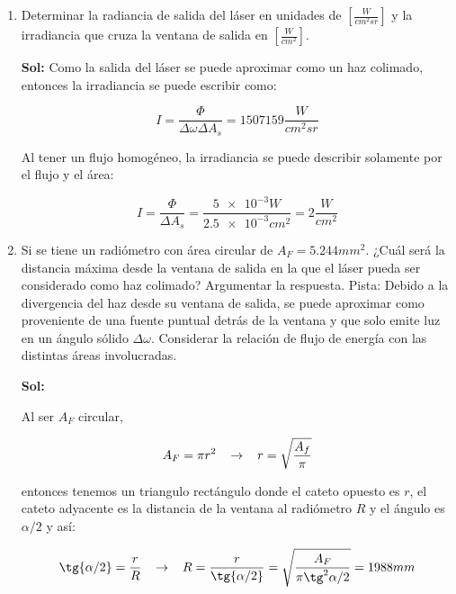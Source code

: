 \documentclass[12pt,a4paper]{article}
\begin{document}
\begin{enumerate}
\begin{enumerate}
    \item Determinar la radiancia de salida del láser en unidades de $\left[\frac{W}{cm^2 sr}\right]$ y la irradiancia que cruza la ventana de salida en $\left[\frac{W}{cm^2}\right]$.
    
    \textbf{Sol:}
    Como la salida del láser se puede aproximar como un haz colimado, entonces la irradiancia se puede escribir como:
    
    \begin{equation*}
        I = \frac{\Phi}{\Delta \omega \Delta A_s} = 1507159 \frac{W}{cm^2 sr}
    \end{equation*}
    
     Al tener un flujo homogéneo, la irradiancia se puede describir solamente por el flujo y el área:
     
     \begin{equation*}
         I = \frac{\Phi}{\Delta A_s} = \frac{\num{5e-3}W}{\num{2.5 e-3}cm^2} = 2 \frac{W}{cm^2}
     \end{equation*}
    
    
    
    
    
    \item Si se tiene un radiómetro con área circular de $A_F = 5.244 mm^2$. ¿Cuál será la distancia máxima desde la ventana de salida en la que el láser pueda ser considerado como haz colimado? Argumentar la respuesta. Pista: Debido a la divergencia del haz desde su ventana de salida, se puede aproximar como proveniente de una fuente puntual detrás de la ventana y que solo emite luz en un ángulo sólido $\Delta \omega$. Considerar la relación de flujo de energía con las distintas áreas involucradas.
    
    \textbf{Sol:}
    
    Al ser $A_F$ circular,
    
    \begin{equation*}
        A_F = \pi r^2 \hspace{0.3cm} \rightarrow \hspace{0.3cm} r = \sqrt{\frac{A_f}{\pi}}
    \end{equation*}
    
    entonces tenemos un triangulo rectángulo donde el cateto opuesto es $r$, el cateto adyacente es la distancia de la ventana al radiómetro $R$ y el ángulo es $\alpha/2$ y así:
    
    \begin{equation*}
        \tg{\alpha/2} = \frac{r}{R} \hspace{0.3cm} \rightarrow \hspace{0.3cm} R = \frac{r} {\tg{\alpha/2}} =\sqrt{\frac{A_F}{\pi\tg^2{\alpha/2}}}  = 1988 mm
    \end{equation*}
\end{enumerate}




\end{enumerate}
\end{document}
